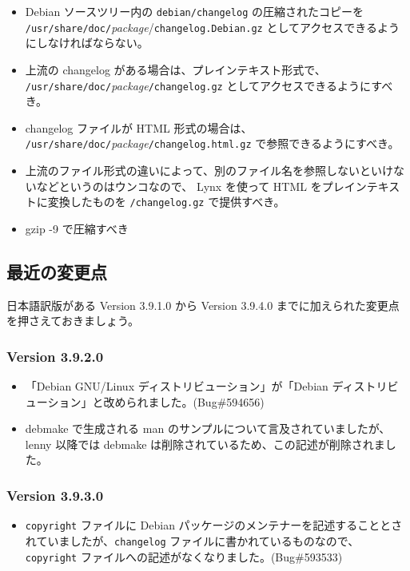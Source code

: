 \documentclass[mingoth,a4paper]{jsarticle}
\begin{document}
\begin{itemize}
\item Debian ソースツリー内の
{\tt debian/changelog} の圧縮されたコピーを
{\tt /usr/share/doc/}{\it package}/{\tt changelog.Debian.gz} としてアクセスできるようにしなければならない。
\item 上流の changelog がある場合は、プレインテキスト形式で、
{\tt /usr/share/doc/}{\it package}{\tt /changelog.gz} としてアクセスできるようにすべき。
\item changelog ファイルが HTML 形式の場合は、
{\tt /usr/share/doc/}{\it package}{\tt /changelog.html.gz} で参照できるようにすべき。
\item 上流のファイル形式の違いによって、別のファイル名を参照しないといけないなどというのはウンコなので、
Lynx を使って HTML をプレインテキストに変換したものを {\tt /changelog.gz} で提供すべき。
\item gzip -9 で圧縮すべき
\end{itemize}

\subsection{最近の変更点}
日本語訳版がある Version 3.9.1.0 から Version 3.9.4.0 までに加えられた変更点を押さえておきましょう。

\subsubsection{Version 3.9.2.0}
\begin{itemize}
\item 「Debian GNU/Linux ディストリビューション」が「Debian ディストリビューション」と改められました。(Bug\#594656)
\item debmake で生成される man のサンプルについて言及されていましたが、lenny 以降では debmake は削除されているため、この記述が削除されました。
\end{itemize}

\subsubsection{Version 3.9.3.0}
\begin{itemize}
\item {\tt copyright} ファイルに Debian パッケージのメンテナーを記述することとされていましたが、{\tt changelog} ファイルに書かれているものなので、{\tt copyright} ファイルへの記述がなくなりました。(Bug\#593533)
\end{itemize}
\end{document}
